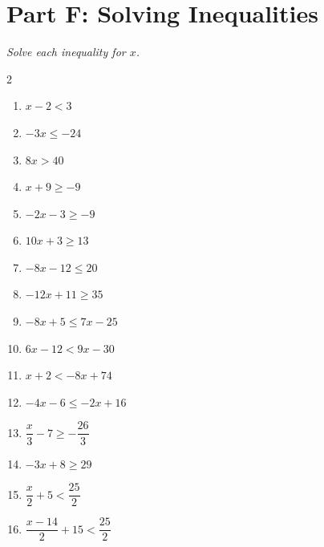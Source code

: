 \documentclass[11pt]{article}
\begin{document}
\section*{Part F: Solving Inequalities}
\noindent\textit{Solve each inequality for $x$.}
\begin{multicols}{2}
\begin{enumerate}
  \item $x - 2 < 3$
  \vspace{1.8cm}
  \item $-3x \le -24$
  \vspace{1.8cm}
  \item $8x > 40$
  \vspace{1.8cm}
  \item $x + 9 \ge -9$
  \vspace{1.8cm}
  \item $-2x - 3 \ge -9$
  \vspace{1.8cm}
  \item $10x + 3 \ge 13$
  \vspace{1.8cm}
  \item $-8x - 12 \le 20$
  \vspace{1.8cm}
  \item $-12x + 11 \ge 35$
  \vspace{1.8cm}
  \item $-8x + 5 \le 7x - 25$
  \vspace{1.8cm}
  \item $6x - 12 < 9x - 30$
  \vspace{1.8cm}
  \item $x + 2 < -8x + 74$
  \vspace{1.8cm}
  \item $-4x - 6 \le -2x + 16$
  \vspace{1.8cm}
  \item $\dfrac{x}{3} - 7 \ge -\dfrac{26}{3}$
  \vspace{1.8cm}
  \item $-3x + 8 \ge 29$
  \vspace{1.8cm}
  \item $\dfrac{x}{2} + 5 < \dfrac{25}{2}$
  \vspace{1.8cm}
  \item $\dfrac{x - 14}{2} + 15 < \dfrac{25}{2}$
  \vspace{1.8cm}
\end{enumerate}
\end{multicols}
\end{document}
